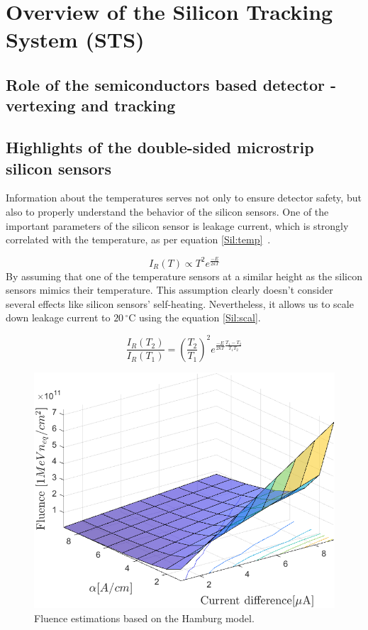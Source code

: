 
\section{Overview of the Silicon Tracking System (STS)}
\subsection{Role of the semiconductors based detector - vertexing and tracking}
\subsection{Highlights of the double-sided microstrip silicon sensors}
\label{sensors}
Information about the temperatures serves not only to ensure detector safety, but also to properly understand the behavior of the silicon sensors. One of the important parameters of the silicon sensor is leakage current, which is strongly correlated with the temperature, as per equation \ref{Sil:temp}~\cite{Hartmann:2017gzy}.

\begin{equation}
\label{Sil:temp}
    I_{R}(T) \propto T^{2}e^{\frac{-E}{2kT}}
\end{equation}
 By assuming that one of the  temperature sensors at a similar height as the silicon sensors mimics their temperature. This assumption clearly doesn't consider several effects like silicon sensors' self-heating. Nevertheless, it allows us to scale down leakage current to $20\,^{\circ}$C using the equation \ref{Sil:scal}.
 
\begin{equation}
\label{Sil:scal}
    \frac{I_{R}(T_{2})}{I_{R}(T_{1})} = (\frac{T_{2}}{T_{1}})^{2}e^{\frac{-E}{2kT}\frac{T_{1}-T_{2}}{T_{1}T_{2}}}
\end{equation}

\begin{figure}[!h]
\centering
\includegraphics[width=0.65\columnwidth]{Chapter2/images/Leakage_current.png}
\caption{Fluence estimations based on the Hamburg model.}
\label{fig_leakage}
\end{figure}

